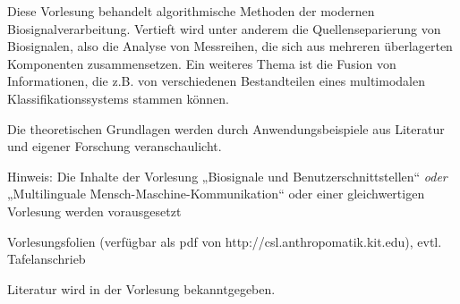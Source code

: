 \begin{course}
\begin{learningoutcomes}
\end{learningoutcomes}

\begin{content}
Diese Vorlesung behandelt algorithmische Methoden der modernen Biosignalverarbeitung. Vertieft wird unter anderem die Quellenseparierung von Biosignalen, also die Analyse von Messreihen, die sich aus mehreren überlagerten Komponenten zusammensetzen. Ein weiteres Thema ist die Fusion von Informationen, die z.B. von verschiedenen Bestandteilen eines multimodalen Klassifikationssystems stammen können.

 

Die theoretischen Grundlagen werden durch Anwendungsbeispiele aus Literatur und eigener Forschung veranschaulicht.

 

Hinweis: Die Inhalte der Vorlesung „Biosignale und Benutzerschnittstellen“ \emph{oder} „Multilinguale Mensch-Maschine-Kommunikation“ oder einer gleichwertigen Vorlesung werden vorausgesetzt


\end{content}

\begin{media}Vorlesungsfolien (verfügbar als pdf von http://csl.anthropomatik.kit.edu), evtl. Tafelanschrieb

\end{media}

\begin{literature}Literatur wird in der Vorlesung bekanntgegeben.

\end{literature}



\end{course}